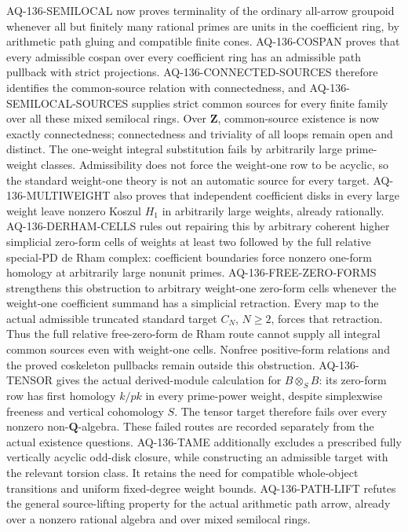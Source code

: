 \begin{description}[style=nextline,leftmargin=0pt]
AQ-136-SEMILOCAL now proves terminality of the ordinary all-arrow
groupoid whenever all but finitely many rational primes are units in
the coefficient ring, by arithmetic path gluing and compatible finite
cones. AQ-136-COSPAN proves that every admissible cospan over every
coefficient ring has an admissible path pullback with strict projections.
AQ-136-CONNECTED-SOURCES therefore identifies the common-source relation
with connectedness, and AQ-136-SEMILOCAL-SOURCES supplies strict common
sources for every finite family over all these mixed semilocal rings.
Over $\mathbf Z$, common-source existence is now exactly connectedness;
connectedness and triviality of all loops remain open and distinct. The one-weight integral substitution fails by arbitrarily large
prime-weight classes. Admissibility does not force the weight-one
row to be acyclic, so the standard weight-one theory is not an
automatic source for every target. AQ-136-MULTIWEIGHT also proves
that independent coefficient disks in every large weight leave nonzero
Koszul $H_1$ in arbitrarily large weights, already rationally.
AQ-136-DERHAM-CELLS rules out repairing this by arbitrary coherent
higher simplicial zero-form cells of weights at least two followed
by the full relative special-PD de Rham complex: coefficient
boundaries force nonzero one-form homology at arbitrarily large
nonunit primes. AQ-136-FREE-ZERO-FORMS strengthens this obstruction
to arbitrary weight-one zero-form cells whenever the weight-one
coefficient summand has a simplicial retraction. Every map to the
actual admissible truncated standard target $C_N$, $N\geq2$, forces
that retraction. Thus the full relative free-zero-form de Rham route
cannot supply all integral common sources even with weight-one cells.
Nonfree positive-form relations and the proved coskeleton pullbacks
remain outside this obstruction.
AQ-136-TENSOR gives the actual derived-module calculation for
$B\otimes_S B$: its zero-form row has first homology $k/pk$
in every prime-power weight, despite simplexwise freeness and vertical
cohomology $S$. The tensor target therefore fails over every nonzero
non-$\mathbf Q$-algebra. These failed routes are recorded
separately from the actual existence questions.
AQ-136-TAME additionally excludes a prescribed fully vertically
acyclic odd-disk closure, while constructing an admissible target
with the relevant torsion class. It retains the need for compatible
whole-object transitions and uniform fixed-degree weight bounds. AQ-136-PATH-LIFT refutes the
general source-lifting property for the actual arithmetic path arrow,
already over a nonzero rational algebra and over mixed semilocal rings.

\end{description}

